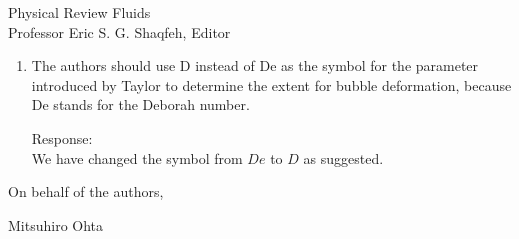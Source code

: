 \documentclass{letter}
\begin{document}
\begin{letter}{
Physical Review Fluids\\
Professor Eric S. G. Shaqfeh, Editor\\}
\begin{enumerate}
Response: \\
The paper by Wei et al. is now cited in the Introduction.\\

\par\noindent
\item
\textsf
{The authors should use D instead of De as the symbol for the parameter introduced by Taylor to 
determine the extent for bubble deformation, because De stands for the Deborah number.\\
}
\vspace{5 mm}

Response: \\
We have changed the symbol from $De$ to $D$ as suggested.\\

\end{enumerate}

\closing{On behalf of the authors,}
Mitsuhiro Ohta

\end{letter}
\end{document}
